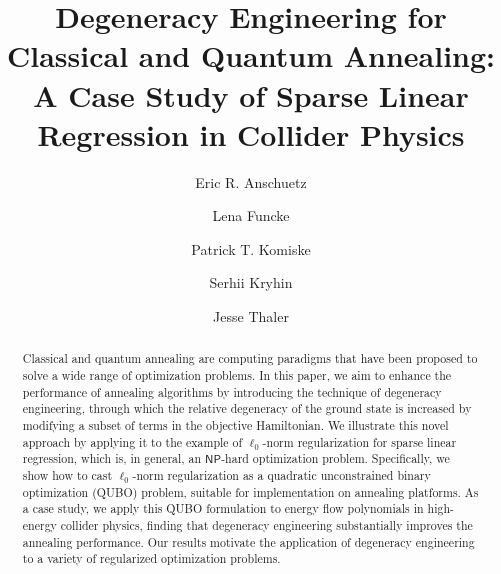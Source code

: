 \documentclass[aps,prd,twocolumn, superscriptaddress,preprintnumbers, nofootinbib,longbibliography,floatfix]{revtex4-2}
\begin{document}


\title{Degeneracy Engineering for Classical and Quantum Annealing:\\ A Case Study of Sparse Linear Regression in Collider Physics}

\author{Eric R. Anschuetz}

\author{Lena Funcke}

\author{Patrick T. Komiske}

\author{Serhii Kryhin}


\author{Jesse Thaler}



\begin{abstract}
%
Classical and quantum annealing are computing paradigms that have been proposed to solve a wide range of optimization problems.
%
In this paper, we aim to enhance the performance of annealing algorithms by introducing the technique of degeneracy engineering, through which the relative degeneracy of the ground state is increased by modifying a subset of terms in the objective Hamiltonian.
%
We illustrate this novel approach by applying it to the example of $\ell_0$-norm regularization for sparse linear regression, which is, in general, an $\textsf{NP}$-hard optimization problem.
%
Specifically, we show how to cast $\ell_0$-norm regularization as a quadratic unconstrained binary optimization (QUBO) problem, suitable for implementation on annealing platforms.
%
As a case study, we apply this QUBO formulation to energy ﬂow polynomials in high-energy collider physics, finding that degeneracy engineering substantially improves the annealing performance.
%
Our results motivate the application of degeneracy engineering to a variety of regularized optimization problems.
%
\end{abstract}
\end{document}
